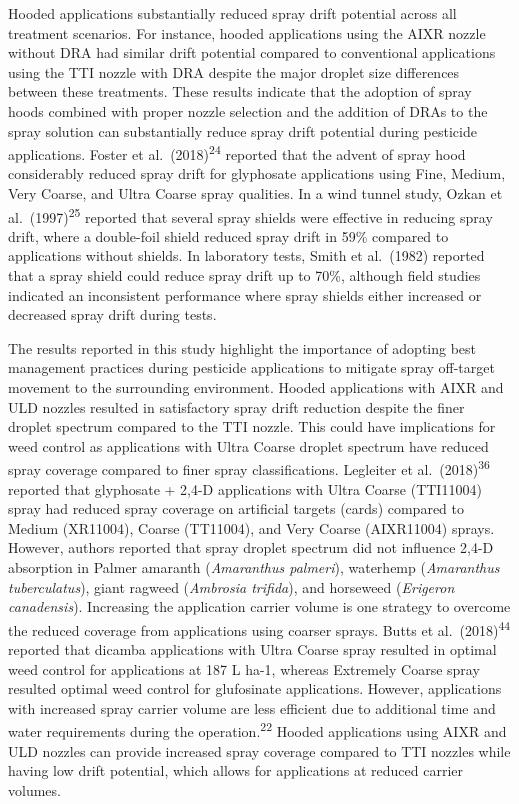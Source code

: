\documentclass[
  12pt,
  a4paper,
]{article}
\begin{document}
Hooded applications substantially reduced spray drift potential across
all treatment scenarios. For instance, hooded applications using the
AIXR nozzle without DRA had similar drift potential compared to
conventional applications using the TTI nozzle with DRA despite the
major droplet size differences between these treatments. These results
indicate that the adoption of spray hoods combined with proper nozzle
selection and the addition of DRAs to the spray solution can
substantially reduce spray drift potential during pesticide
applications. Foster et al.~(2018)\textsuperscript{24} reported that the
advent of spray hood considerably reduced spray drift for glyphosate
applications using Fine, Medium, Very Coarse, and Ultra Coarse spray
qualities. In a wind tunnel study, Ozkan et
al.~(1997)\textsuperscript{25} reported that several spray shields were
effective in reducing spray drift, where a double-foil shield reduced
spray drift in 59\% compared to applications without shields. In
laboratory tests, Smith et al.~(1982) reported that a spray shield could
reduce spray drift up to 70\%, although field studies indicated an
inconsistent performance where spray shields either increased or
decreased spray drift during tests.

The results reported in this study highlight the importance of adopting
best management practices during pesticide applications to mitigate
spray off-target movement to the surrounding environment. Hooded
applications with AIXR and ULD nozzles resulted in satisfactory spray
drift reduction despite the finer droplet spectrum compared to the TTI
nozzle. This could have implications for weed control as applications
with Ultra Coarse droplet spectrum have reduced spray coverage compared
to finer spray classifications. Legleiter et
al.~(2018)\textsuperscript{36} reported that glyphosate + 2,4-D
applications with Ultra Coarse (TTI11004) spray had reduced spray
coverage on artificial targets (cards) compared to Medium (XR11004),
Coarse (TT11004), and Very Coarse (AIXR11004) sprays. However, authors
reported that spray droplet spectrum did not influence 2,4-D absorption
in Palmer amaranth (\emph{Amaranthus palmeri}), waterhemp
(\emph{Amaranthus tuberculatus}), giant ragweed (\emph{Ambrosia
trifida}), and horseweed (\emph{Erigeron canadensis}). Increasing the
application carrier volume is one strategy to overcome the reduced
coverage from applications using coarser sprays. Butts et
al.~(2018)\textsuperscript{44} reported that dicamba applications with
Ultra Coarse spray resulted in optimal weed control for applications at
187 L ha-1, whereas Extremely Coarse spray resulted optimal weed control
for glufosinate applications. However, applications with increased spray
carrier volume are less efficient due to additional time and water
requirements during the operation.\textsuperscript{22} Hooded
applications using AIXR and ULD nozzles can provide increased spray
coverage compared to TTI nozzles while having low drift potential, which
allows for applications at reduced carrier volumes.
\end{document}
